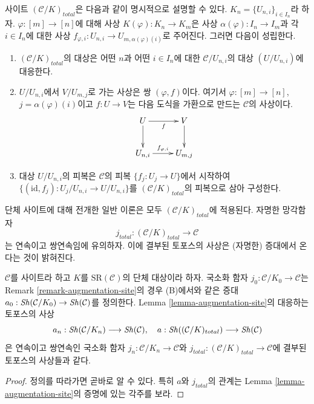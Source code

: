 \medskip\noindent
사이트 $(\mathcal{C}/K)_{total}$은 다음과 같이 명시적으로 설명할 수 있다.
$K_n = \{U_{n, i}\}_{i \in I_n}$라 하자.
$\varphi : [m] \to [n]$에 대해 사상
$K(\varphi) : K_n \to K_m$은 사상 $\alpha(\varphi) : I_n \to I_m$과
각 $i \in I_n$에 대한 사상
$f_{\varphi, i} : U_{n, i} \to U_{m, \alpha(\varphi)(i)}$로 주어진다.
그러면 다음이 성립한다.
\begin{enumerate}
\item $(\mathcal{C}/K)_{total}$의 대상은 어떤 $n$과 어떤
$i \in I_n$에 대한 $\mathcal{C}/U_{n, i}$의 대상
$(U/U_{n, i})$에 대응한다.
\item $U/U_{n, i}$에서 $V/U_{m, j}$로 가는 사상은
쌍 $(\varphi, f)$이다. 여기서 $\varphi : [m] \to [n]$,
$j = \alpha(\varphi)(i)$이고 $f : U \to V$는 다음 도식을
가환으로 만드는 $\mathcal{C}$의 사상이다.
$$
\vcenter{
\xymatrix{
U \ar[r]_f \ar[d] & V \ar[d] \\
U_{n, i} \ar[r]^-{f_{\varphi, i}} &
U_{m, j}
}
}
$$
\item 대상 $U/U_{n, i}$의 피복은 $\mathcal{C}$의 피복
$\{f_j : U_j \to U\}$에서 시작하여
$\{(\text{id}, f_j) : U_j/U_{n, i} \to U/U_{n, i}\}$를
$(\mathcal{C}/K)_{total}$의 피복으로 삼아 구성한다.
\end{enumerate}
단체 사이트에 대해 전개한 일반 이론은 모두
$(\mathcal{C}/K)_{total}$에 적용된다. 자명한 망각함자
$$
j_{total} : (\mathcal{C}/K)_{total} \longrightarrow \mathcal{C}
$$
는 연속이고 쌍연속임에 유의하자. 이에 결부된 토포스의 사상은
(자명한) 증대에서 온다는 것이 밝혀진다.

\begin{lemma}
\label{lemma-augmentation-simplicial-semi-representable}
$\mathcal{C}$를 사이트라 하고 $K$를 $\text{SR}(\mathcal{C})$의
단체 대상이라 하자. 국소화 함자
$j_0 : \mathcal{C}/K_0 \to \mathcal{C}$는 Remark
\ref{remark-augmentation-site}의 경우 (B)에서와 같은 증대
$a_0 : \mathop{\mathit{Sh}}\nolimits(\mathcal{C}/K_0) \to \mathop{\mathit{Sh}}\nolimits(\mathcal{C})$를 정의한다.
Lemma \ref{lemma-augmentation-site}의 대응하는 토포스의 사상
$$
a_n : \mathop{\mathit{Sh}}\nolimits(\mathcal{C}/K_n) \longrightarrow \mathop{\mathit{Sh}}\nolimits(\mathcal{C}),\quad
a : \mathop{\mathit{Sh}}\nolimits((\mathcal{C}/K)_{total}) \longrightarrow \mathop{\mathit{Sh}}\nolimits(\mathcal{C})
$$
은 연속이고 쌍연속인 국소화 함자
$j_n : \mathcal{C}/K_n \to \mathcal{C}$와
$j_{total} : (\mathcal{C}/K)_{total} \to \mathcal{C}$에 결부된
토포스의 사상들과 같다.
\end{lemma}

\begin{proof}
정의를 따라가면 곧바로 알 수 있다. 특히 $a$와 $j_{total}$의 관계는
Lemma \ref{lemma-augmentation-site}의 증명에 있는 각주를 보라.
\end{proof}

